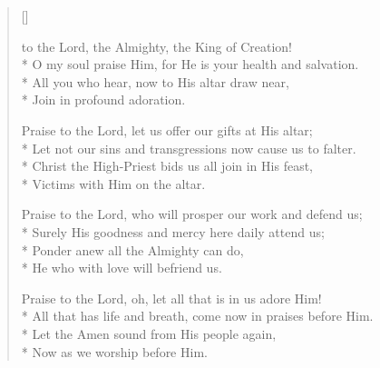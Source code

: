 \newHymn


\settowidth{\versewidth}{Praise to the Lord, the Almighty, the King ofCr}

\begin{verse}[\versewidth]

 to the Lord, the Almighty, the King of Creation!\\*
O my soul praise Him, for He is your health and salvation.\\*
All you who hear, now to His altar draw near,\\*
Join in profound adoration.

Praise to the Lord, let us offer our gifts at His altar;\\*
Let not our sins and transgressions now cause us to falter.\\*
Christ the High-Priest bids us all join in His feast,\\*
Victims with Him on the altar.

Praise to the Lord, who will prosper our work and defend us;\\*
Surely His goodness and mercy here daily attend us;\\*
Ponder anew all the Almighty can do,\\*
He who with love will befriend us.

Praise to the Lord, oh, let all that is in us adore Him!\\*
All that has life and breath, come now in praises before Him.\\*
Let the Amen sound from His people again,\\*
Now as we worship before Him.

\end{verse}

